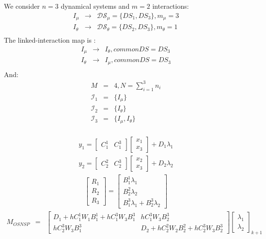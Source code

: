 \documentclass[10pt]{report}
\begin{document}
We consider $n=3$ dynamical systems and $m=2$ interactions:
\begin{eqnarray*}
I_{\mu}& \rightarrow& \mathcal{DS}_{\mu} = \{DS_1, DS_3\}, m_{\mu} = 3 \\
I_{\theta}&\rightarrow& \mathcal{DS}_{\theta} = \{DS_2, DS_3\}, m_{\theta} = 1  \\
\end{eqnarray*}
The linked-interaction map is :
\begin{eqnarray*}
I_{\mu} &\rightarrow& I_{\theta}, commonDS = DS_3 \\
I_{\theta} &\rightarrow&I_{\mu}, commonDS = DS_3 \\
\end{eqnarray*}
And:
\begin{eqnarray*}
M &=& 4, N = \displaystyle{\sum_{i=1}^{3} n_i} \\
\mathcal{I}_1 &=& \{I_{\mu} \}\\
\mathcal{I}_2 &=& \{I_{\theta}\} \\
\mathcal{I}_3 &=& \{I_{\mu}, I_{\theta}\} \\
\end{eqnarray*}

\begin{eqnarray}
y_1 = \left[\begin{array}{ccc}
C_1^1 & C_1^3 \end{array}\right]
\left[\begin{array}{c}
x_1 \\
x_3
\end{array}\right]
+ D_1\lambda_1 \\
y_2 = \left[\begin{array}{ccc}
C_2^2 & C_2^3 \end{array}\right]
\left[\begin{array}{c}
x_2 \\
x_3
\end{array}\right]
+ D_2\lambda_2
\end{eqnarray}
%
\begin{eqnarray}
\left[\begin{array}{c}
R_1 \\
R_2 \\
R_3 \end{array}\right]=
\left[\begin{array}{c}
B_1^1\lambda_1  \\
B_2^2\lambda_2  \\
B_1^3\lambda_1 + B_2^3\lambda_2
\end{array}\right]
\end{eqnarray}
%
\begin{eqnarray}
M_{OSNSP} &=& \left[\begin{array}{cc}
D_1+hC_1^1W_1B_1^1+hC_1^3W_3B_1^3 & hC_1^3W_3B_2^3 \\
hC_2^3W_3B_1^3 & D_2+hC_2^2W_2B_2^2+hC_2^3W_3B_2^3
\end{array}\right]\left[\begin{array}{c}
\lambda_1  \\
\lambda_2
\end{array}\right]_{k+1}
\end{eqnarray}
\end{document}

